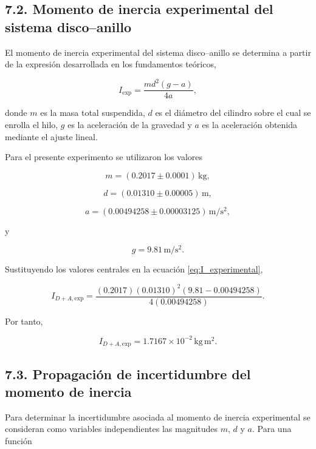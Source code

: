 \documentclass[11pt,a4paper]{article}
\begin{document}
\subsection*{7.2. Momento de inercia experimental del sistema disco--anillo}

El momento de inercia experimental del sistema disco--anillo se determina
a partir de la expresión desarrollada en los fundamentos teóricos,

\begin{equation}
    I_{\mathrm{exp}}
    =
    \frac{m d^2(g-a)}{4a},
    \label{eq:I_experimental}
\end{equation}

donde \(m\) es la masa total suspendida, \(d\) es el diámetro del
cilindro sobre el cual se enrolla el hilo, \(g\) es la aceleración de la
gravedad y \(a\) es la aceleración obtenida mediante el ajuste lineal.

Para el presente experimento se utilizaron los valores

\[
    m=(0.2017\pm0.0001)\,\mathrm{kg},
\]

\[
    d=(0.01310\pm0.00005)\,\mathrm{m},
\]

\[
    a=(0.00494258\pm0.00003125)\,\mathrm{m/s^2},
\]

y

\[
    g=9.81\,\mathrm{m/s^2}.
\]

Sustituyendo los valores centrales en la ecuación
\eqref{eq:I_experimental},

\[
I_{D+A,\mathrm{exp}}
=
\frac{
(0.2017)(0.01310)^2
(9.81-0.00494258)
}{
4(0.00494258)
}.
\]

Por tanto,

\begin{equation}
    I_{D+A,\mathrm{exp}}
    =
    1.7167\times10^{-2}\,\mathrm{kg\,m^2}.
    \label{eq:I_exp_disco_anillo}
\end{equation}



\subsection*{7.3. Propagación de incertidumbre del momento de inercia}

Para determinar la incertidumbre asociada al momento de inercia
experimental se consideran como variables independientes las magnitudes
\(m\), \(d\) y \(a\). Para una función
\end{document}
